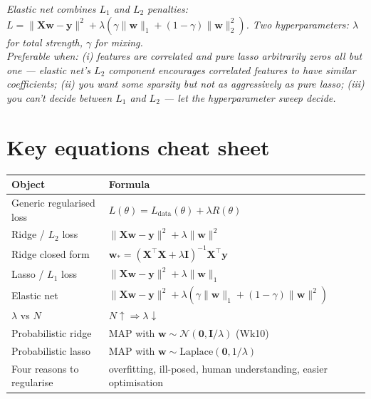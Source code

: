 \documentclass[11pt, a4paper]{article}
\newcommand{\thead}[1]{\textbf{#1}}
\begin{document}
\begin{exambox}
\textit{Elastic net combines $L_1$ and $L_2$ penalties: $L = \|\mathbf{X}\mathbf{w}-\mathbf{y}\|^2 + \lambda(\gamma\|\mathbf{w}\|_1 + (1-\gamma)\|\mathbf{w}\|_2^2)$. Two hyperparameters: $\lambda$ for total strength, $\gamma$ for mixing.}\\[0.3em]
\textit{Preferable when: (i) features are correlated and pure lasso arbitrarily zeros all but one — elastic net's $L_2$ component encourages correlated features to have similar coefficients; (ii) you want some sparsity but not as aggressively as pure lasso; (iii) you can't decide between $L_1$ and $L_2$ — let the hyperparameter sweep decide.}
\end{exambox}

\section*{Key equations cheat sheet}

\begin{tabularx}{\linewidth}{@{}lX@{}}
\toprule
\thead{Object} & \thead{Formula} \\
\midrule
Generic regularised loss   & $L(\theta) = L_{\text{data}}(\theta) + \lambda R(\theta)$ \\
Ridge / $L_2$ loss         & $\|\mathbf{X}\mathbf{w}-\mathbf{y}\|^2 + \lambda\|\mathbf{w}\|^2$ \\
Ridge closed form          & $\mathbf{w}_* = (\mathbf{X}^\top\mathbf{X} + \lambda\mathbf{I})^{-1}\mathbf{X}^\top\mathbf{y}$ \\
Lasso / $L_1$ loss         & $\|\mathbf{X}\mathbf{w}-\mathbf{y}\|^2 + \lambda\|\mathbf{w}\|_1$ \\
Elastic net                & $\|\mathbf{X}\mathbf{w}-\mathbf{y}\|^2 + \lambda(\gamma\|\mathbf{w}\|_1 + (1-\gamma)\|\mathbf{w}\|^2)$ \\
$\lambda$ vs $N$           & $N \uparrow \Rightarrow \lambda \downarrow$ \\
Probabilistic ridge        & MAP with $\mathbf{w}\sim\mathcal{N}(\mathbf{0}, \mathbf{I}/\lambda)$ (Wk10) \\
Probabilistic lasso        & MAP with $\mathbf{w}\sim\text{Laplace}(\mathbf{0},1/\lambda)$ \\
Four reasons to regularise & overfitting, ill-posed, human understanding, easier optimisation \\
\bottomrule
\end{tabularx}
\end{document}

